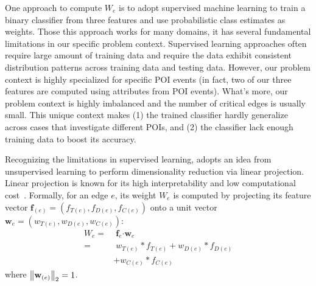
One approach to compute $W_e$ is to adopt supervised machine learning to train a binary classifier from three features and use probabilistic class estimates as weights.
Those this approach works for many domains, it has several fundamental limitations in our specific problem context. Supervised learning approaches often require large amount of training data and require the data exhibit consistent distribution patterns across training data and testing data. However, our problem context is highly specialized for specific POI events (in fact, two of our three features are computed using attributes from POI events). What's more, our problem context is highly imbalanced and the number of critical edges is usually small.
This unique context makes (1) the trained classifier hardly generalize across cases that investigate different POIs, and (2) the classifier lack enough training data to boost its accuracy.


Recognizing the limitations in supervised learning, \tool adopts an idea from unsupervised learning to perform dimensionality reduction via linear projection.
Linear projection is known for its high interpretability and low computational cost~\cite{friedman2001elements}.
Formally, for an edge $e$, its weight $W_e$ is computed by projecting its feature vector $\mathbf{f}_{(e)} = (f_{T(e)}, f_{D(e)}, f_{C(e)})$ onto a unit vector $\mathbf{w}_{e} = (w_{T(e)}, w_{D(e)}, w_{C(e)})$:
\begin{align}
    W_e   = &\; \mathbf{f}_{e} \boldsymbol{\cdot} \mathbf{w}_{e} \nonumber \\
                 = &\; w_{T(e)} * f_{T(e)} + w_{D(e)} * f_{D(e)} \nonumber \\
                & + w_{C(e)} * f_{C(e)}\label{eq:projection}
\end{align}
where $\left\lVert \mathbf{w}_{(e)} \right\rVert_2 = 1$.



